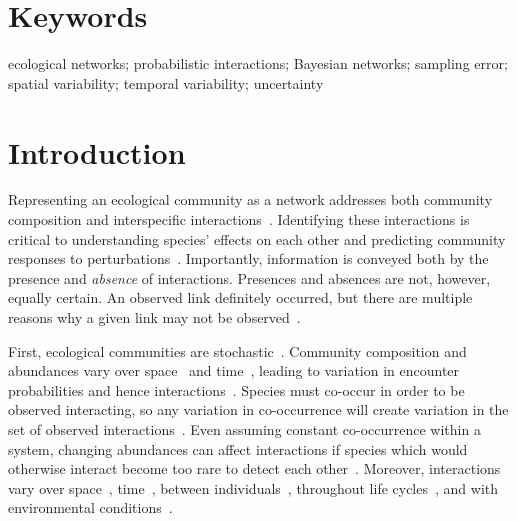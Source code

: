 \documentclass[12pt]{article}
\begin{document}
\begin{spacing}{2.0}
\section*{\small Keywords}

ecological networks; probabilistic interactions; Bayesian networks; sampling error; spatial variability; temporal variability; uncertainty

\linenumbers
\clearpage

\section*{Introduction}

    Representing an ecological community as a network addresses both community composition and interspecific interactions~\citep{Roslin2016}. Identifying these interactions is critical to understanding species' effects on each other and predicting community responses to perturbations~\citep{Bartomeus2016,Giron2018}. Importantly, information is conveyed both by the presence and \emph{absence} of interactions. Presences and absences are not, however, equally certain. An observed link definitely occurred, but there are multiple reasons why a given link may not be observed~\citep{Jordano2016}. 


    First, ecological communities are stochastic~\citep{Gotelli2000}. Community composition and abundances vary over space~\citep{Baiser2012} and time~\citep{Olesen2011a}, leading to variation in encounter probabilities and hence interactions~\citep{Vazquez2005,Poisot2015}. Species must co-occur in order to be observed interacting, so any variation in co-occurrence will create variation in the set of observed interactions~\citep{Gravel2018,Graham2018}. Even assuming constant co-occurrence within a system, changing abundances can affect interactions if species which would otherwise interact become too rare to detect each other~\citep{Tylianakis2010,Jordano2016}. Moreover, interactions vary over space~\citep{Kitching1987,Baiser2012}, time~\citep{Olesen2011a,Lopez2017}, between individuals~\citep{Pires2011a,Wells2013,Fodrie2015,Novak2015}, throughout life cycles~\citep{Clegg2018}, and with environmental conditions~\citep{Poisot2015}.



\end{spacing}
\end{document}
